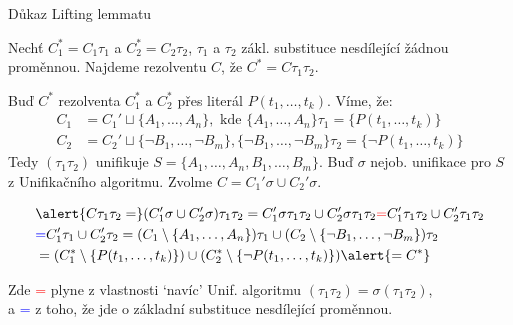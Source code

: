 \documentclass{beamer}
\begin{document}
\begin{frame}{Důkaz Lifting lemmatu}

    Nechť \alert{$C^*_1=C_1\tau_1$} a \alert{$C^*_2=C_2\tau_2$}, $\tau_1$ a $\tau_2$ zákl. substituce nesdílející žádnou proměnnou. Najdeme rezolventu $C$, že \alert{$C^*=C\tau_1\tau_2$}.

    Buď $C^*$ rezolventa $C_1^*$ a $C_2^*$ přes literál $P(t_1,\dots,t_k)$. Víme, že:
    \begin{align*}
        C_1&=C_1' \sqcup \{A_1,\dots,A_n\},\text{ kde }\{A_1,\dots,A_n\}\tau_1=\{P(t_1,\dots,t_k)\}\\
        C_2&=C_2' \sqcup \{\neg B_1,\dots,\neg B_m\},\{\neg B_1,\dots,\neg B_m\}\tau_2=\{\neg P(t_1,\dots,t_k)\}
    \end{align*}
    Tedy $(\tau_1\tau_2)$ unifikuje $S=\{A_1,\dots,A_n,B_1,\dots,B_m\}$. Buď $\sigma$ nejob. unifikace pro $S$ z Unifikačního algoritmu. Zvolme \alert{$C=C_1'\sigma \cup C_2'\sigma$}.

    \vspace{-24pt}
    
    \begin{align*}
        &\alert{C\tau_1\tau_2
        =} (C_1'\sigma \cup C_2'\sigma)\tau_1\tau_2
        =C_1'\sigma\tau_1\tau_2 \cup C_2'\sigma\tau_1\tau_2
        \textcolor{red}{=}C_1'\tau_1\tau_2 \cup C_2'\tau_1\tau_2\\ &
        \textcolor{blue}{=}C_1'\tau_1 \cup C_2'\tau_2
        =(C_1\setminus\{A_1,\dots,A_n\})\tau_1\cup (C_2\setminus\{\neg B_1,\dots,\neg B_m\})\tau_2\\
        &=(C_1^*\setminus\{P(t_1,\dots,t_k)\})\cup(C_2^*\setminus \{\neg P(t_1,\dots,t_k)\})\alert{=C^*}
    \end{align*}
    
    Zde \textcolor{red}{=} plyne z vlastnosti `navíc' Unif. algoritmu $(\tau_1\tau_2)=\sigma(\tau_1\tau_2)$, \\a \textcolor{blue}{=} z 
    toho, že jde o základní substituce nesdílející proměnnou.\hfill\qedsymbol    

\end{frame}
\end{document}
